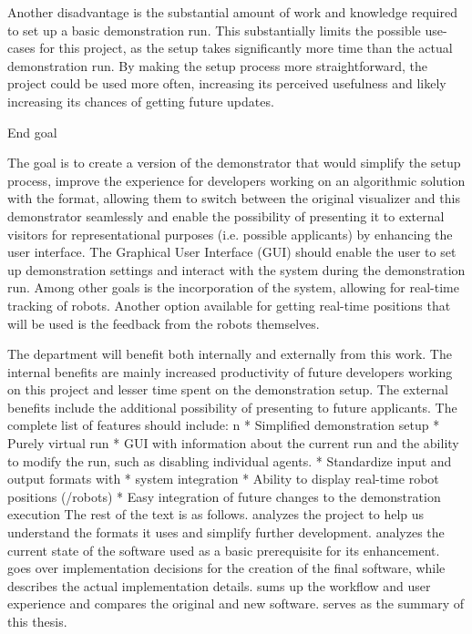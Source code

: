Another disadvantage is the substantial amount of work and knowledge required to set up a basic demonstration run. This substantially limits the possible use-cases for this project, as the setup takes significantly more time than the actual demonstration run. By making the setup process more straightforward, the project could be used more often, increasing its perceived usefulness and likely increasing its chances of getting future updates.

\sec End goal

The goal is to create a version of the demonstrator that would simplify the setup process, improve the experience for developers working on an algorithmic solution with the {\mapfIR} format, allowing them to switch between the original visualizer and this demonstrator seamlessly and enable the possibility of presenting it to external visitors for representational purposes (i.e. possible applicants) by enhancing the user interface.\br
The Graphical User Interface (GUI) should enable the user to set up demonstration settings and interact with the system during the demonstration run.
Among other goals is the incorporation of the {\vicon} system, allowing for real-time tracking of robots. Another option available for getting real-time positions that will be used is the feedback from the robots themselves.\br
\br

The department will benefit both internally and externally from this work. The internal benefits are mainly increased productivity of future developers working on this project and lesser time spent on the demonstration setup. The external benefits include the additional possibility of presenting to future applicants.
The complete list of features should include:
\begitems \style n
    * Simplified demonstration setup
    * Purely virtual run
    * GUI with information about the current run and the ability to modify the run, such as disabling individual agents. 
    * Standardize input and output formats with \mapfIR
    * {\vicon} system integration
    * Ability to display real-time robot positions ({\vicon}/robots)
    * Easy integration of future changes to the demonstration execution
\enditems
\br
The rest of the text is as follows.
{} analyzes the {\mapfIR} project to help us understand the formats it uses and simplify further development. {} analyzes the current state of the software used as a basic prerequisite for its enhancement. {} goes over implementation decisions for the creation of the final software, while {} describes the actual implementation details. {} sums up the workflow and user experience and compares the original and new software. {} serves as the summary of this thesis.